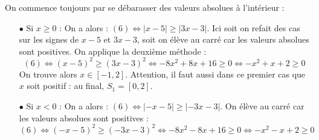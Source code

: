 \begin{correction}
\begin{enumerate}
On commence toujours par se d\'ebarasser des valeurs absolues \`a l'int\'erieur :
\begin{itemize}
\item[$\bullet$] Si $x\geq 0$ : On a alors : $(6) \Leftrightarrow |x-5| \geq |3x-3|$. Ici soit on refait des cas sur les signes de $x-5$ et $3x-3$, soit on \'el\`eve au carr\'e car les valeurs absolues sont positives. On applique la deuxi\`eme m\'ethode :
$$(6) \Leftrightarrow (x-5)^2 \geq (3x-3)^2 \Leftrightarrow -8x^2+8x+16 \geq 0 \Leftrightarrow -x^2+x+2 \geq 0$$ 
On trouve alors $x \in [-1,2]$. Attention, il faut aussi dans ce premier cas que $x$ soit positif : au final, $S_1=[0,2]$.
\item[$\bullet$] Si $x < 0$ : On a alors : $(6) \Leftrightarrow |-x-5| \geq |-3x-3|$. On \'el\`eve au carr\'e car les valeurs absolues sont positives :
$$(6) \Leftrightarrow (-x-5)^2 \geq (-3x-3)^2 \Leftrightarrow -8x^2-8x+16 \geq 0 \Leftrightarrow -x^2-x+2 \geq 0$$ 

\end{itemize}
\end{enumerate}
\end{correction}
